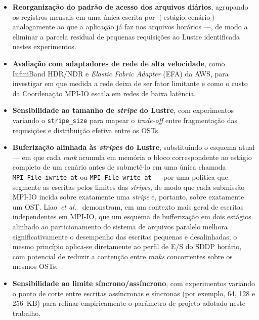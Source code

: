 \begin{itemize}
  \item \textbf{Reorganização do padrão de acesso dos arquivos
        diários}, agrupando os registros mensais em uma única
        escrita por $(\text{estágio}, \text{cenário})$ ---
        analogamente ao que a aplicação já faz nos arquivos horários ---,
        de modo a eliminar a parcela residual de pequenas
        requisições ao Lustre identificada nestes experimentos.

  \item \textbf{Avaliação com adaptadores de rede de alta
        velocidade}, como InfiniBand HDR/NDR e \textit{Elastic
        Fabric Adapter} (EFA) da AWS, para investigar em que
        medida a rede deixa de ser fator limitante e como o custo
        da Coordenação MPI-IO escala em redes de baixa latência.

  \item \textbf{Sensibilidade ao tamanho de \textit{stripe} do
        Lustre}, com experimentos variando o \texttt{stripe\_size}
        para mapear o \textit{trade-off} entre fragmentação das
        requisições e distribuição efetiva entre os OSTs.

  \item \textbf{Buferização alinhada às \textit{stripes} do Lustre},
        substituindo o esquema atual --- em que cada \textit{rank}
        acumula em memória o bloco correspondente ao estágio
        completo de um cenário antes de submetê-lo em uma única
        chamada \texttt{MPI\_File\_iwrite\_at} ou
        \texttt{MPI\_File\_write\_at} --- por uma política que
        segmente as escritas pelos limites das \textit{stripes}, de
        modo que cada submissão MPI-IO incida sobre exatamente uma
        \textit{stripe} e, portanto, sobre exatamente um OST.
        Liao~\textit{et al.}~\cite{LiaoIPDPS:07} demonstram, em um
        contexto mais geral de escritas independentes em MPI-IO,
        que um esquema de bufferização em dois estágios alinhado ao
        particionamento do sistema de arquivos paralelo melhora
        significativamente o desempenho das escritas pequenas e
        desalinhadas; o mesmo princípio aplica-se diretamente ao
        perfil de E/S do SDDP horário, com potencial de reduzir a
        contenção entre \textit{ranks} concorrentes sobre os mesmos
        OSTs.

  \item \textbf{Sensibilidade ao limite síncrono/assíncrono}, com
        experimentos variando o ponto de corte entre escritas
        assíncronas e síncronas (por exemplo, 64, 128 e
        256~KB) para refinar empiricamente o parâmetro de projeto
        adotado neste trabalho.


\end{itemize}
